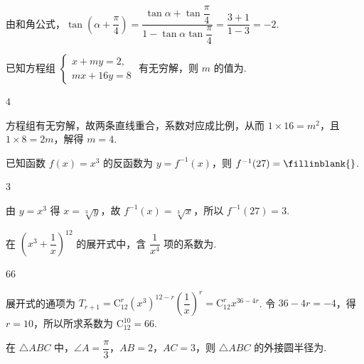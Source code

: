 \begin{solution}
由和角公式，\(\tan\left(\alpha+\dfrac\pi4\right)=\dfrac{\tan\alpha+\tan\dfrac\pi4}{1-\tan\alpha\tan\dfrac\pi4}=\dfrac{3+1}{1-3}=-2\).
\end{solution}

\begin{problem}
已知方程组 \(\begin{cases}
x+my=2,\\
mx+16y=8
\end{cases}\) 有无穷解，则 \(m\) 的值为\fillinblank{}.
\end{problem}

\begin{answer}
\(4\)
\end{answer}

\begin{solution}
方程组有无穷解，故两条直线重合，系数对应成比例，从而 \(1\times16=m^2\)，且 \(1\times8=2m\)，解得 \(m=4\).
\end{solution}

\begin{problem}
已知函数 \(f(x)=x^3\) 的反函数为 \(y=f^{-1}(x)\)，则 \(f^{-1}(27)=\fillinblank{}\).
\end{problem}

\begin{answer}
\(3\)
\end{answer}

\begin{solution}
由 \(y=x^3\) 得 \(x=\sqrt[3]{y}\)，故 \(f^{-1}(x)=\sqrt[3]{x}\)，所以 \(f^{-1}(27)=3\).
\end{solution}

\begin{problem}
在 \(\left(x^3+\dfrac1x\right)^{12}\) 的展开式中，含 \(\dfrac1{x^4}\) 项的系数为\fillinblank{}.
\end{problem}

\begin{answer}
\(66\)
\end{answer}

\begin{solution}
展开式的通项为 \(T_{r+1}=\mathrm C_{12}^{r}(x^3)^{12-r}\left(\dfrac1x\right)^r=\mathrm C_{12}^{r}x^{36-4r}\). 令 \(36-4r=-4\)，得 \(r=10\)，所以所求系数为 \(\mathrm C_{12}^{10}=66\).
\end{solution}

\begin{problem}
在 \(\triangle ABC\) 中，\(\angle A=\dfrac\pi3\)，\(AB=2\)，\(AC=3\)，则 \(\triangle ABC\) 的外接圆半径为\fillinblank{}.
\end{problem}

